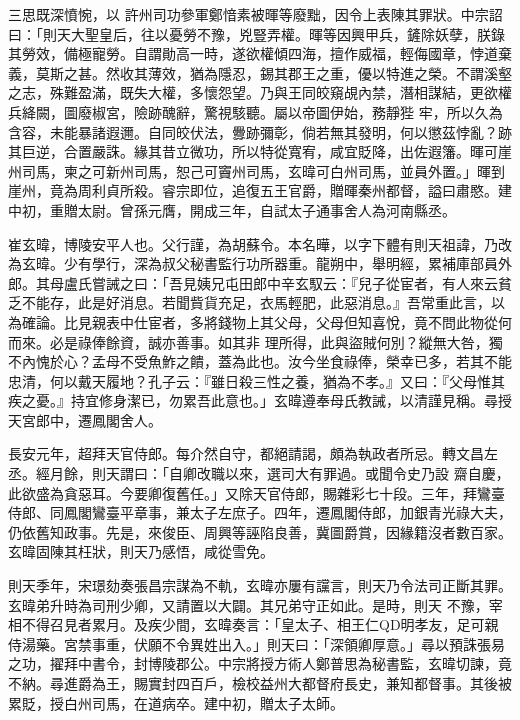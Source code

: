 \begin{pinyinscope}
 三思既深憤惋，以
 許州司功參軍鄭愔素被暉等廢黜，因令上表陳其罪狀。中宗詔曰：「則天大聖皇后，往以憂勞不豫，兇豎弄權。暉等因興甲兵，鏟除妖孽，朕錄其勞效，備極寵勞。自謂勛高一時，遂欲權傾四海，擅作威福，輕侮國章，悖道棄義，莫斯之甚。然收其薄效，猶為隱忍，錫其郡王之重，優以特進之榮。不謂溪壑之志，殊難盈滿，既失大權，多懷怨望。乃與王同皎窺覘內禁，潛相謀結，更欲權兵絳闕，圖廢椒宮，險跡醜辭，驚視駭聽。屬以帝圖伊始，務靜狴
 牢，所以久為含容，未能暴諸遐邇。自同皎伏法，釁跡彌彰，倘若無其發明，何以懲茲悖亂？跡其巨逆，合置嚴誅。緣其昔立微功，所以特從寬宥，咸宜貶降，出佐遐籓。暉可崖州司馬，柬之可新州司馬，恕己可竇州司馬，玄暐可白州司馬，並員外置。」暉到崖州，竟為周利貞所殺。睿宗即位，追復五王官爵，贈暉秦州都督，謚曰肅愍。建中初，重贈太尉。曾孫元膺，開成三年，自試太子通事舍人為河南縣丞。



 崔玄暐，博陵安平人也。父行謹，為胡蘇令。本名曄，以字下體有則天祖諱，乃改為玄暐。少有學行，深為叔父秘書監行功所器重。龍朔中，舉明經，累補庫部員外郎。其母盧氏嘗誡之曰：「吾見姨兄屯田郎中辛玄馭云：『兒子從宦者，有人來云貧乏不能存，此是好消息。若聞貲貨充足，衣馬輕肥，此惡消息。』吾常重此言，以為確論。比見親表中仕宦者，多將錢物上其父母，父母但知喜悅，竟不問此物從何而來。必是祿俸餘資，誠亦善事。如其非
 理所得，此與盜賊何別？縱無大咎，獨不內愧於心？孟母不受魚鮓之饋，蓋為此也。汝今坐食祿俸，榮幸已多，若其不能忠清，何以戴天履地？孔子云：『雖日殺三性之養，猶為不孝。』又曰：『父母惟其疾之憂。』持宜修身潔已，勿累吾此意也。」玄暐遵奉母氏教誡，以清謹見稱。尋授天宮郎中，遷鳳閣舍人。



 長安元年，超拜天官侍郎。每介然自守，都絕請謁，頗為執政者所忌。轉文昌左丞。經月餘，則天謂曰：「自卿改職以來，選司大有罪過。或聞令史乃設
 齋自慶，此欲盛為貪惡耳。今要卿復舊任。」又除天官侍郎，賜雜彩七十段。三年，拜鸞臺侍郎、同鳳閣鸞臺平章事，兼太子左庶子。四年，遷鳳閣侍郎，加銀青光祿大夫，仍依舊知政事。先是，來俊臣、周興等誣陷良善，冀圖爵賞，因緣籍沒者數百家。玄暐固陳其枉狀，則天乃感悟，咸從雪免。



 則天季年，宋璟劾奏張昌宗謀為不軌，玄暐亦屢有讜言，則天乃令法司正斷其罪。玄暐弟升時為司刑少卿，又請置以大闢。其兄弟守正如此。是時，則天
 不豫，宰相不得召見者累月。及疾少間，玄暐奏言：「皇太子、相王仁QD明孝友，足可親侍湯藥。宮禁事重，伏願不令異姓出入。」則天曰：「深領卿厚意。」尋以預誅張易之功，擢拜中書令，封博陵郡公。中宗將授方術人鄭普思為秘書監，玄暐切諫，竟不納。尋進爵為王，賜實封四百戶，檢校益州大都督府長史，兼知都督事。其後被累貶，授白州司馬，在道病卒。建中初，贈太子太師。




\end{pinyinscope}
